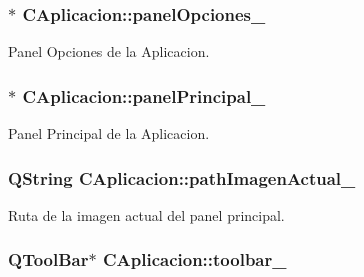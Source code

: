 \subsubsection[{\texorpdfstring{panel\+Opciones\+\_\+}{panelOpciones_}}]{$\ast$ C\+Aplicacion\+::panel\+Opciones\+\_\+\hspace{0.3cm}{\ttfamily [private]}}\hypertarget{classCAplicacion_adc38c4ae217096b72da9911d6cf39f47}{}\label{classCAplicacion_adc38c4ae217096b72da9911d6cf39f47}


Panel Opciones de la Aplicacion. 

\subsubsection[{\texorpdfstring{panel\+Principal\+\_\+}{panelPrincipal_}}]{$\ast$ C\+Aplicacion\+::panel\+Principal\+\_\+\hspace{0.3cm}{\ttfamily [private]}}\hypertarget{classCAplicacion_ac795b4ce529859a5d5c03e15ed78d967}{}\label{classCAplicacion_ac795b4ce529859a5d5c03e15ed78d967}


Panel Principal de la Aplicacion. 

\subsubsection[{\texorpdfstring{path\+Imagen\+Actual\+\_\+}{pathImagenActual_}}]{\setlength{\rightskip}{0pt plus 5cm}Q\+String C\+Aplicacion\+::path\+Imagen\+Actual\+\_\+\hspace{0.3cm}{\ttfamily [private]}}\hypertarget{classCAplicacion_a990b6780cd5e1d941f01e7df20958587}{}\label{classCAplicacion_a990b6780cd5e1d941f01e7df20958587}


Ruta de la imagen actual del panel principal. 

\subsubsection[{\texorpdfstring{toolbar\+\_\+}{toolbar_}}]{\setlength{\rightskip}{0pt plus 5cm}Q\+Tool\+Bar$\ast$ C\+Aplicacion\+::toolbar\+\_\+\hspace{0.3cm}{\ttfamily [private]}}\hypertarget{classCAplicacion_a2dca58bda4c34c0f76d8c95fcbba064c}{}\label{classCAplicacion_a2dca58bda4c34c0f76d8c95fcbba064c}


